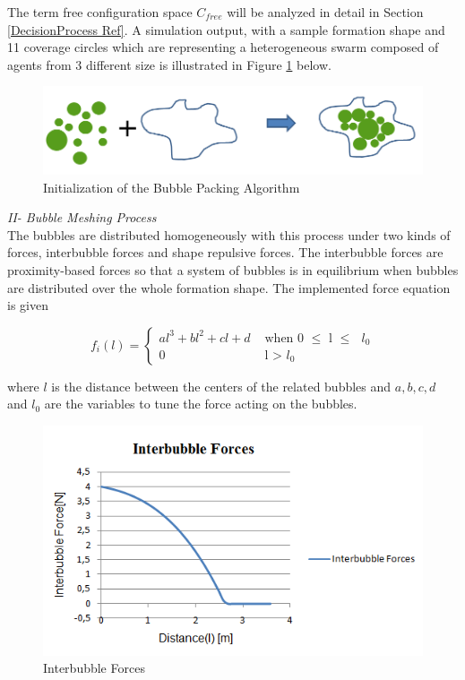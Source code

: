 The term free configuration space $C_{free}$ will be analyzed in detail in Section \ref{DecisionProcess Ref}. A simulation output, with a sample formation shape and 11 coverage circles which are representing a heterogeneous swarm composed of agents from 3 different size is illustrated in Figure \ref{algorithm1_ref} below.
		
\begin{figure}[H]
\caption{Initialization of the Bubble Packing Algorithm} \label{algorithm1_ref}
\centering
\includegraphics[scale = 0.50]{bubble_packing}
\end{figure}
				
\textit{			II- Bubble Meshing Process } \\ 
The bubbles are distributed homogeneously with this process under two kinds of forces, interbubble forces and shape repulsive forces. The interbubble forces are proximity-based forces so that a system of bubbles is in equilibrium when bubbles are distributed over the whole formation shape. The implemented force equation is given
		
\begin{equation}
f_i(l) = \left\{ \begin{array}{rl}
al^3 + bl^2 + cl + d &\mbox{ when 0 $\leq$ l $\leq$ $l_0$} \\
0                               &\mbox{ l > $l_0$}
\end{array} \right.
\end{equation}

where $l$ is the distance between the centers of the related bubbles and $a,b,c,d$ and $l_0$ are the variables to tune the force acting on the bubbles. 

\begin{figure}[H]
\caption{Interbubble Forces}
\centering
\includegraphics[scale = 0.70]{interbubble_forces}
\end{figure}
	
